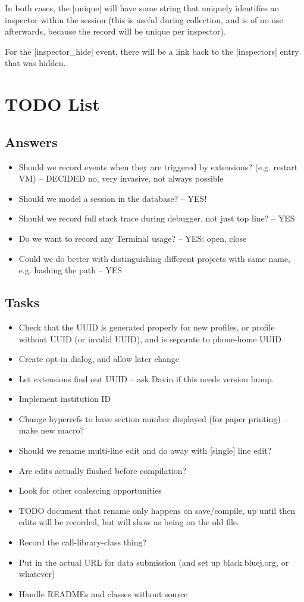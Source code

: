 \documentclass{book}
\begin{document}
In both cases, the |unique| will have some string that uniquely identifies an
inspector within the session (this is useful during collection, and is of no
use afterwards, because the record will be unique per inspector).

For the |inspector_hide| event, there will be a link back to the |inspectors|
entry that was hidden.

\chapter{TODO List}

\section{Answers}

\begin{itemize}
\item Should we record events when they are triggered by extensions?
  (e.g. restart VM) -- DECIDED no, very invasive, not always possible
\item Should we model a session in the database? -- YES!
\item Should we record full stack trace during debugger, not just top line? -- YES
\item Do we want to record any Terminal usage? -- YES: open, close
\item Could we do better with distinguishing different projects with same
  name, e.g. hashing the path -- YES
\end{itemize}

\section{Tasks}

\begin{itemize}
\item Check that the UUID is generated properly for new profiles, or profile without
UUID (or invalid UUID), and is separate to phone-home UUID
\item Create opt-in dialog, and allow later change
\item Let extensions find out UUID -- ask Davin if this needs version bump.
\item Implement institution ID
\item Change hyperrefs to have section number displayed (for paper printing)
  -- make new macro?
\item Should we rename multi-line edit and do away with [single] line edit?
\item Are edits actually flushed before compilation?
\item Look for other coalescing opportunities
\item TODO document that rename only happens on save/compile, up until then
  edits will be recorded, but will show as being on the old file.
\item Record the call-library-class thing?
\item Put in the actual URL for data submission (and set up black.bluej.org,
  or whatever)
\item Handle READMEs and classes without source
\end{itemize}
\end{document}
